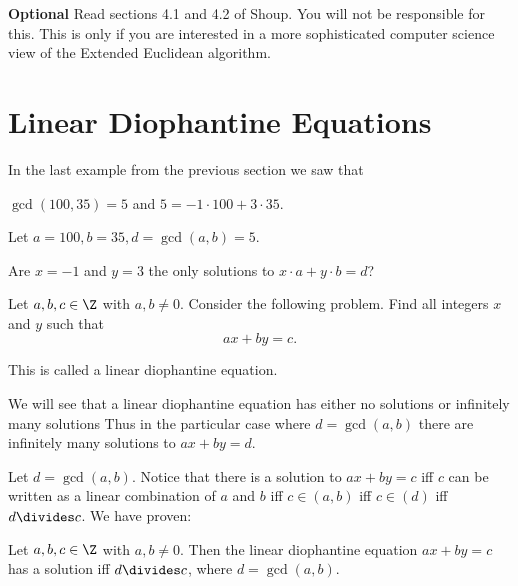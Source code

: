 \documentclass[oneside,12pt]{amsart}
\begin{document}
\bigskip

\textbf{Optional} Read sections 4.1 and 4.2 of Shoup. You will not be responsible for this. This is only if you are interested
in a more sophisticated computer science view of the Extended Euclidean algorithm.

\newpage

\section{Linear Diophantine Equations}

In the last example from the previous section we saw that 

$\gcd(100,35) = 5$ and $5 = -1 \cdot 100 + 3 \cdot 35$.

\begin{question}
Let $a=100, b=35, d=\gcd(a,b)=5$.


Are $x=-1$ and $y=3$ the only solutions to $x\cdot a + y\cdot b = d$?

\end{question}

Let $a,b,c\in\Z$ with $a,b\not=0$. Consider the following problem. Find all integers $x$ and $y$ such that
$$ax+by=c.$$

This is called a linear diophantine equation.

We will see that a linear diophantine equation has either no solutions or infinitely many solutions Thus in
the particular case where $d=\gcd(a,b)$ there are infinitely many solutions to $ax+by=d$.

Let $d=\gcd(a,b)$.
Notice that there is a solution to $ax+by=c$ iff $c$ can be written as a linear combination of $a$ and $b$
iff $c\in(a,b)$ iff $c\in(d)$ iff $d\divides c$. We have proven:

\begin{theorem}
Let $a,b,c\in\Z$ with $a,b\not=0$. Then the linear diophantine equation $ax+by=c$ has a solution iff
$d\divides c$, where $d=\gcd(a,b)$.
\end{theorem}







\end{document}
